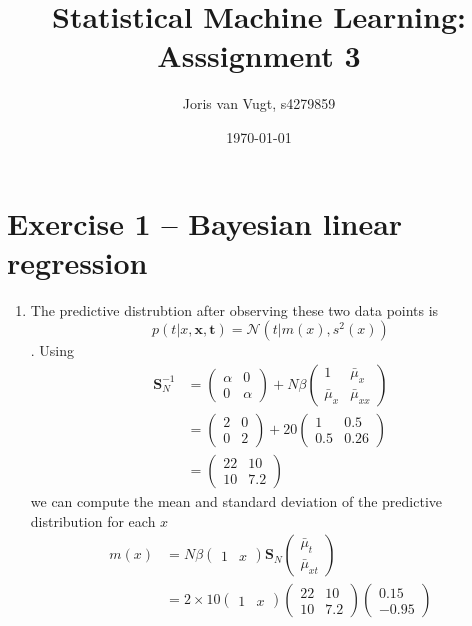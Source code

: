 \documentclass{article}
\author{Joris van Vugt, s4279859}
\date{\today}
\title{Statistical Machine Learning: Asssignment 3}
\begin{document}
\maketitle
\section*{Exercise 1 -- Bayesian linear regression}
\begin{enumerate}
\item The predictive distrubtion after observing these two data points is
$$ p(t| x, \bm{x}, \bm{t}) = \mathcal{N}(t|m(x), s^2(x)) $$.
Using
\begin{align*}
\bm{S}_N^{-1} &= \begin{pmatrix}\alpha & 0 \\ 0 & \alpha\end{pmatrix} + N\beta\begin{pmatrix}1 & \bar{\mu}_x \\ \bar{\mu}_x & \bar{\mu}_{xx}\end{pmatrix} \\
&= \begin{pmatrix}2 & 0 \\ 0 & 2\end{pmatrix} + 20\begin{pmatrix}1 & 0.5 \\ 0.5 & 0.26\end{pmatrix} \\
&= \begin{pmatrix}22 & 10 \\ 10 & 7.2\end{pmatrix}
\end{align*}
we can compute the mean and standard deviation of the predictive distribution for each $x$
\begin{align*}
m(x) &= N\beta\begin{pmatrix}1 & x\end{pmatrix} \bm{S}_N\begin{pmatrix} \bar{\mu}_t \\ \bar{\mu}_{xt} \end{pmatrix} \\
&= 2 \times 10\begin{pmatrix}1 & x\end{pmatrix}\begin{pmatrix}22 & 10 \\ 10 & 7.2\end{pmatrix}\begin{pmatrix}0.15 \\ -0.95\end{pmatrix} \\

\end{align*}
\end{enumerate}
\end{document}
